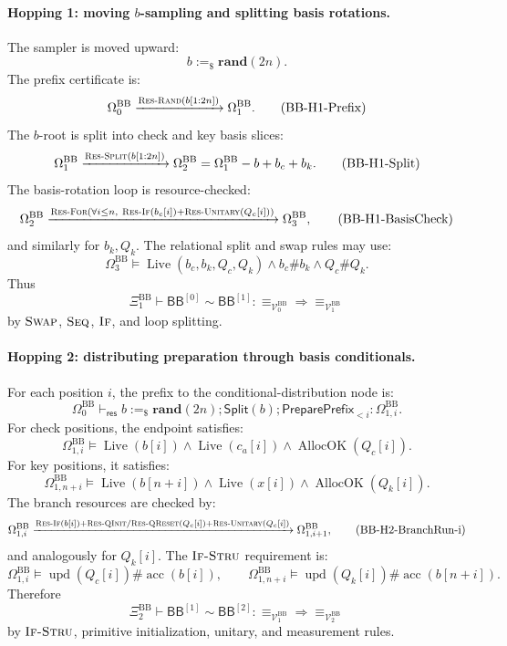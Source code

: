 \documentclass{report}
\theoremstyle{defn_style}
\providecommand{\Live}{\operatorname{Live}}
\providecommand{\AllocOK}{\operatorname{AllocOK}}
\providecommand{\acc}{\operatorname{acc}}
\providecommand{\upd}{\operatorname{upd}}
\providecommand{\HopBB}[1]{\mathsf{BB}^{[#1]}}
\begin{document}
\paragraph{Hopping 1: moving \(b\)-sampling and splitting basis rotations.}
The sampler is moved upward:
\[
b:=_\$\mathbf{rand}(2n).
\]
The prefix certificate is:
\[
\Omega^{\mathrm{BB}}_0
\xrightarrow{\textsc{Res-Rand}(b[1{:}2n])}
\Omega^{\mathrm{BB}}_1.
\tag{BB-H1-Prefix}\label{BB-H1-Prefix}
\]
The \(b\)-root is split into check and key basis slices:
\[
\Omega^{\mathrm{BB}}_1
\xrightarrow{\textsc{Res-Split}(b[1{:}2n])}
\Omega^{\mathrm{BB}}_2
=
\Omega^{\mathrm{BB}}_1-b+b_c+b_k.
\tag{BB-H1-Split}
\]
The basis-rotation loop is resource-checked:
\[
\Omega^{\mathrm{BB}}_2
\xrightarrow{
\textsc{Res-For}
\left(
\forall i\le n,\ 
\textsc{Res-If}(b_c[i])+\textsc{Res-Unitary}(Q_c[i])
\right)}
\Omega^{\mathrm{BB}}_3,
\tag{BB-H1-BasisCheck}
\]
and similarly for \(b_k,Q_k\).  The relational split and swap rules may use:
\[
\Omega^{\mathrm{BB}}_3
\models
\Live(b_c,b_k,Q_c,Q_k)
\land
b_c\#b_k
\land
Q_c\#Q_k.
\tag{BB-H1-Req}
\]
Thus
\[
\Xi^{\mathrm{BB}}_1
\vdash
\HopBB{0}\sim\HopBB{1}:
\equiv_{\mathcal V^{\mathrm{BB}}_0}
\Longrightarrow
\equiv_{\mathcal V^{\mathrm{BB}}_1}
\tag{BB-H1-Rel}\label{BB-H1-Rel}
\]
by \(\textsc{Swap}\), \(\textsc{Seq}\), \(\textsc{If}\), and loop splitting.

\paragraph{Hopping 2: distributing preparation through basis conditionals.}
For each position \(i\), the prefix to the conditional-distribution node is:
\[
\Omega^{\mathrm{BB}}_0
\vdash_{\mathsf{res}}
b:=_\$\mathbf{rand}(2n);
\mathsf{Split}(b);
\mathsf{PreparePrefix}_{<i}
:
\Omega^{\mathrm{BB}}_{1,i}.
\tag{BB-H2-Prefix-i}\label{BB-H2-Prefix-i}
\]
For check positions, the endpoint satisfies:
\[
\Omega^{\mathrm{BB}}_{1,i}
\models
\Live(b[i])
\land
\Live(c_a[i])
\land
\AllocOK(Q_c[i]).
\tag{BB-H2-CheckReq-i}
\]
For key positions, it satisfies:
\[
\Omega^{\mathrm{BB}}_{1,n+i}
\models
\Live(b[n+i])
\land
\Live(x[i])
\land
\AllocOK(Q_k[i]).
\tag{BB-H2-KeyReq-i}
\]
The branch resources are checked by:
\[
\Omega^{\mathrm{BB}}_{1,i}
\xrightarrow{\textsc{Res-If}(b[i])+
\textsc{Res-QInit}/\textsc{Res-QReset}(Q_c[i])+
\textsc{Res-Unitary}(Q_c[i])}
\Omega^{\mathrm{BB}}_{1,i+1},
\tag{BB-H2-BranchRun-i}
\]
and analogously for \(Q_k[i]\).  The \(\textsc{If-Stru}\) requirement is:
\[
\Omega^{\mathrm{BB}}_{1,i}
\models
\upd(Q_c[i])\#\acc(b[i]),
\qquad
\Omega^{\mathrm{BB}}_{1,n+i}
\models
\upd(Q_k[i])\#\acc(b[n+i]).
\tag{BB-H2-IfStruReq}
\]
Therefore
\[
\Xi^{\mathrm{BB}}_2
\vdash
\HopBB{1}\sim\HopBB{2}:
\equiv_{\mathcal V^{\mathrm{BB}}_1}
\Longrightarrow
\equiv_{\mathcal V^{\mathrm{BB}}_2}
\tag{BB-H2-Rel}\label{BB-H2-Rel}
\]
by \(\textsc{If-Stru}\), primitive initialization, unitary, and measurement
rules.
\end{document}
